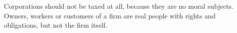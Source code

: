 Corporations should not be taxed at all, because they are no moral subjects. Owners, workers or customers of a firm are real people with rights and obligations, but not the firm itself.
